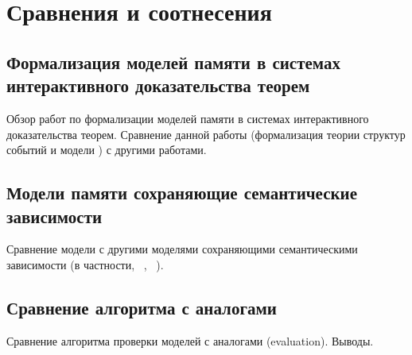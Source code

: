 \chapter{Сравнения и соотнесения}
\label{ch:related-work}

\section{Формализация моделей памяти в системах интерактивного доказательства теорем}

Обзор работ по формализации моделей памяти
в системах интерактивного доказательства теорем.
Сравнение данной работы (формализация теории структур событий
и модели \Wkm) с другими работами.

\section{Модели памяти сохраняющие семантические зависимости}

Сравнение модели \WkmS с другими моделями
сохраняющими семантическими зависимости
(в частности, \Prm~\cite{Kang-al:POPL17}, \PwP~\cite{Jagadeesan-al:OOPSLA2020}).

\section{Сравнение алгоритма \wmc с аналогами}

Сравнение алгоритма проверки моделей с аналогами (evaluation). Выводы. 

